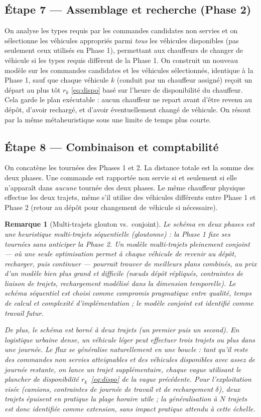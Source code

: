 \documentclass[12pt,a4paper]{report}
\newtheorem{remarque}{Remarque}
\begin{document}
\subsection*{Étape 7 --- Assemblage et recherche (Phase 2)}
On analyse les types requis par les commandes candidates non servies et on sélectionne les véhicules appropriés parmi \emph{tous} les véhicules disponibles (pas seulement ceux utilisés en Phase 1), permettant aux chauffeurs de changer de véhicule si les types requis diffèrent de la Phase 1. On construit un nouveau modèle sur les commandes candidates et les véhicules sélectionnés, identique à la Phase 1, sauf que chaque véhicule $k$ (conduit par un chauffeur assigné) reçoit un départ au plus tôt $r_k$ \eqref{eq:dispo} basé sur l'heure de disponibilité du chauffeur. Cela garde le plan exécutable : aucun chauffeur ne repart avant d'être revenu au dépôt, d'avoir rechargé, et d'avoir éventuellement changé de véhicule. On résout par la même métaheuristique sous une limite de temps plus courte.

\subsection*{Étape 8 --- Combinaison et comptabilité}
On concatène les tournées des Phases 1 et 2. La distance totale est la somme des deux phases. Une commande est rapportée non servie si et seulement si elle n'apparaît dans \emph{aucune} tournée des deux phases. Le même chauffeur physique effectue les deux trajets, même s'il utilise des véhicules différents entre Phase 1 et Phase 2 (retour au dépôt pour changement de véhicule si nécessaire).

\begin{remarque}[Multi-trajets glouton vs.\ conjoint]
Le schéma en deux phases est une heuristique multi-trajets \emph{séquentielle}
(gloutonne) : la Phase 1 fixe ses tournées sans anticiper la Phase 2. Un
modèle multi-trajets pleinement \emph{conjoint} --- où une seule optimisation
permet à chaque véhicule de revenir au dépôt, recharger, puis continuer ---
pourrait trouver de meilleurs plans combinés, au prix d'un modèle bien plus
grand et difficile (nœuds dépôt répliqués, contraintes de liaison de trajets,
rechargement modélisé dans la dimension temporelle). Le schéma séquentiel est
choisi comme compromis pragmatique entre qualité, temps de calcul et
complexité d'implémentation ; le modèle conjoint est identifié comme travail
futur.

De plus, le schéma est borné à \emph{deux} trajets (un premier puis un
second). En logistique urbaine dense, un véhicule léger peut effectuer trois
trajets ou plus dans une journée. Le flux se généralise naturellement en une
\emph{boucle} : tant qu'il reste des commandes non servies atteignables et
des véhicules disponibles avec assez de journée restante, on lance un trajet
supplémentaire, chaque vague utilisant le plancher de disponibilité
$r_k$~\eqref{eq:dispo} de la vague précédente. Pour l'exploitation visée
(camions, contraintes de journée de travail et de rechargement $\delta$),
deux trajets épuisent en pratique la plage horaire utile ; la généralisation
à $N$ trajets est donc identifiée comme extension, sans impact pratique
attendu à cette échelle.
\end{remarque}
\end{document}
